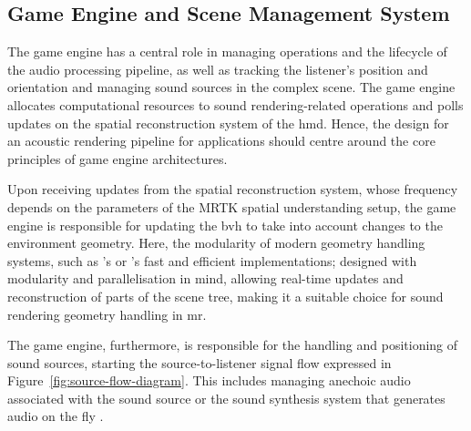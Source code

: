 \subsection{Game Engine and Scene Management System}
The game engine has a central role in managing operations and the lifecycle of the audio processing pipeline, as well as tracking the listener's position and orientation and managing sound sources in the complex scene. The game engine allocates computational resources to sound rendering-related operations and polls updates on the spatial reconstruction system of the \acrshort{hmd}. Hence, the design for an acoustic rendering pipeline for applications should centre around the core principles of game engine architectures.\par
Upon receiving updates from the spatial reconstruction system, whose frequency depends on the parameters of the MRTK spatial understanding setup, the game engine is responsible for updating the \acrshort{bvh} to take into account changes to the environment geometry. Here, the modularity of modern geometry handling systems, such as \cite{kopta2012fast}'s or \cite{lauterbach2009fast}'s fast and efficient implementations; designed with modularity and parallelisation in mind, allowing real-time updates and reconstruction of parts of the scene tree, making it a suitable choice for sound rendering geometry handling in \acrshort{mr}.\par
The game engine, furthermore, is responsible for the handling and positioning of sound sources, starting the source-to-listener signal flow expressed in Figure~\ref{fig:source-flow-diagram}. This includes managing anechoic audio associated with the sound source or the sound synthesis system that generates audio on the fly \citep{hamid2009review}.\par

